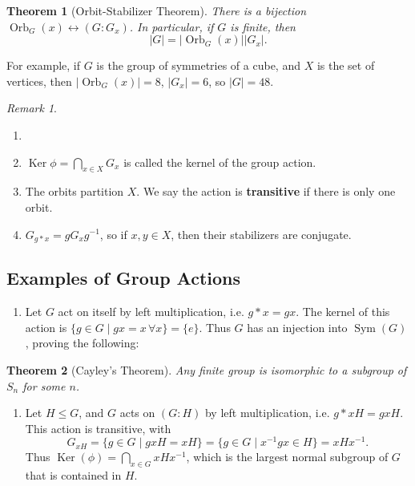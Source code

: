 \documentclass[12pt]{article}
\DeclareMathOperator{\Ker}{Ker}
\DeclareMathOperator{\Sym}{Sym}
\DeclareMathOperator{\Orb}{Orb}
\newtheorem{theorem}{Theorem}[section]
\theoremstyle{definition}
\theoremstyle{remark}
\newtheorem*{remark}{Remark}
\begin{document}
\begin{theorem}[Orbit-Stabilizer Theorem]
	There is a bijection $\Orb_G(x) \leftrightarrow (G:G_x)$. In particular, if $G$ is finite, then
	\[
		|G| = |\!\Orb_{G}(x)||G_x|
	.\]
\end{theorem}

For example, if $G$ is the group of symmetries of a cube, and $X$ is the set of vertices, then $|\!\Orb_G(x)| = 8$, $|G_x| = 6$, so $|G| = 48$.

\begin{remark}
	\begin{enumerate}[label = (\roman*)]
		\item[]
		\item $\displaystyle \Ker \phi = \bigcap_{x \in X} G_x$ is called the kernel of the group action.
		\item The orbits partition $X$. We say the action is \textbf{transitive} if there is only one orbit.
		\item $G_{g \ast x} = g G_{x} g^{-1}$, so if $x, y \in X$, then their stabilizers are conjugate.
	\end{enumerate}
\end{remark}

\subsection{Examples of Group Actions}%
\label{sub:examples_of_group_actions}

\begin{enumerate}[label = (\roman*)]
	\item Let $G$ act on itself by left multiplication, i.e. $g \ast x = gx$. The kernel of this action is $\{g \in G \mid gx = x \, \forall x\} = \{e\}$. Thus $G$ has an injection into $\Sym(G)$, proving the following:	
\end{enumerate}

\begin{theorem}[Cayley's Theorem]
			Any finite group is isomorphic to a subgroup of $S_n$ for some $n$.
\end{theorem}

\begin{enumerate}[resume, label = (\roman*)]
	\item Let $H \leq G$, and $G$ acts on $(G:H)$ by left multiplication, i.e. $g \ast xH = gxH$. This action is transitive, with
		\[
			G_{xH} = \{g \in G \mid gxH = xH\} = \{g \in G \mid x^{-1}gx \in H\} = xHx^{-1}
		.\]
		Thus $\displaystyle \Ker(\phi) = \bigcap_{x \in G} xHx^{-1}$, which is the largest normal subgroup of $G$ that is contained in $H$.
\end{enumerate}
\end{document}

